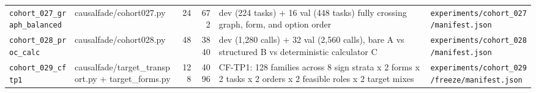 {\begin{longtable}{@{}>{\raggedright\arraybackslash}p{2.6cm}>{\raggedright\arraybackslash}p{2.3cm}rr>{\raggedright\arraybackslash}p{4.6cm}>{\raggedright\arraybackslash}p{3.2cm}@{}}
\texttt{cohort\_027\_graph\_balanced} & causalfade/\allowbreak{}cohort027.py & 24 & 672 & 8 dev (224 tasks) + 16 val (448 tasks) fully crossing graph, form, and option order & \texttt{experiments/\allowbreak{}cohort\_027/\allowbreak{}manifest.json} \\[2pt]
\texttt{cohort\_028\_proc\_calc} & causalfade/\allowbreak{}cohort028.py & 48 & 3840 & 16 dev (1,280 calls) + 32 val (2,560 calls), bare A vs structured B vs deterministic calculator C & \texttt{experiments/\allowbreak{}cohort\_028/\allowbreak{}manifest.json} \\[2pt]
\texttt{cohort\_029\_cftp1} & causalfade/\allowbreak{}target\_transport.py + target\_forms.py & 128 & 4096 & CF-\allowbreak{}TP1: 128 families across 8 sign strata x 2 forms x 2 tasks x 2 orders x 2 feasible roles x 2 target mixes & \texttt{experiments/\allowbreak{}cohort\_029/\allowbreak{}freeze/\allowbreak{}manifest.json} \\[2pt]
\end{longtable}
}